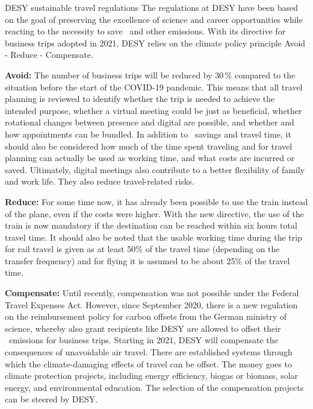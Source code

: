 \documentclass[../SustainableHEP.tex]{subfiles}
\begin{document}
\begin{bestpractice}{DESY sustainable travel regulations}%
    The regulations at DESY have been based on the goal of preserving the excellence of science and career opportunities while reacting to the necessity to save \CdO\ and other emissions. With its directive for business trips adopted in 2021, DESY relies on the climate policy principle Avoid - Reduce - Compensate.

    \textbf{Avoid:} The number of business trips will be reduced by 30\,\% compared to the situation before the start of the COVID-19 pandemic. This means that all travel planning is reviewed to identify whether the trip is needed to achieve the intended purpose, whether a virtual meeting could be just as beneficial, whether rotational changes between presence and digital are possible, and whether and how appointments can be bundled. In addition to \CdO\ savings and travel time, it should also be considered how much of the time spent traveling and for travel planning can actually be used as working time, and what costs are incurred or saved. Ultimately, digital meetings also contribute to a better flexibility of family and work life. They also reduce travel-related risks.

    \textbf{Reduce:} For some time now, it has already been possible to use the train instead of the plane, even if the costs were higher.  With the new directive, the use of the train is now mandatory if the destination can be reached within six hours total travel time. It should also be noted that the usable working time during the trip for rail travel is given as at least 50\;\% of the travel time (depending on the transfer frequency) and for flying it is assumed to be about 25\;\% of the travel time.

    \textbf{Compensate:} Until recently, compensation was not possible under the Federal Travel Expenses Act. However, since September 2020, there is a new regulation on the reimbursement policy for carbon offsets from the German ministry of science, whereby also grant recipients like DESY are allowed to offset their \CdO\ emissions for business trips. Starting in 2021, DESY will compensate the consequences of unavoidable air travel. There are established systems through which the climate-damaging effects of travel can be offset. The money goes to climate protection projects, including energy efficiency, biogas or biomass, solar energy, and environmental education. The selection of the compensation projects can be steered by DESY. 
\end{bestpractice}
\end{document}
